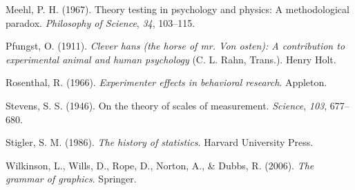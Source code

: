 \documentclass[
  a4paper,
]{book}
\newlength{\cslhangindent}
\newlength{\cslentryspacingunit} %
\newenvironment{CSLReferences}[2] %
 {%
  \setlength{\parindent}{0pt}
  \ifodd #1
  \let\oldpar\par
  \def\par{\hangindent=\cslhangindent\oldpar}
  \fi
  \setlength{\parskip}{#2\cslentryspacingunit}
 }%
 {}
\begin{document}
\begin{CSLReferences}{1}{0}
\leavevmode{}%
Meehl, P. H. (1967). Theory testing in psychology and physics: A
methodological paradox. \emph{Philosophy of Science}, \emph{34},
103--115.

\leavevmode{}%
Pfungst, O. (1911). \emph{Clever hans (the horse of mr. Von osten): A
contribution to experimental animal and human psychology} (C. L. Rahn,
Trans.). Henry Holt.

\leavevmode{}%
Rosenthal, R. (1966). \emph{Experimenter effects in behavioral
research}. Appleton.

\leavevmode{}%
Stevens, S. S. (1946). On the theory of scales of measurement.
\emph{Science}, \emph{103}, 677--680.

\leavevmode{}%
Stigler, S. M. (1986). \emph{The history of statistics}. Harvard
University Press.

\leavevmode{}%
Wilkinson, L., Wills, D., Rope, D., Norton, A., \& Dubbs, R. (2006).
\emph{The grammar of graphics}. Springer.

\end{CSLReferences}


\backmatter

\printindex

\end{document}
